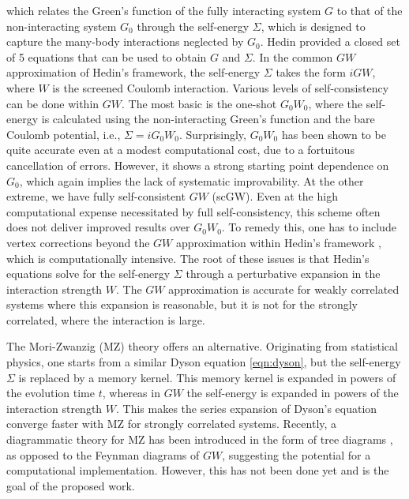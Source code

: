 which relates the Green's function of the fully interacting system \( G \) to that of the non-interacting system \( G_0 \) through the self-energy \( \Sigma \), which is designed to capture the many-body interactions neglected by \( G_0 \). Hedin provided a closed set of 5 equations that can be used to obtain \( G \) and \( \Sigma \). In the common \( GW \) approximation of Hedin's framework, the self-energy \( \Sigma \) takes the form \( iGW \), where \( W \) is the screened Coulomb interaction. Various levels of self-consistency can be done within \( GW \). The most basic is the one-shot \( G_0W_0 \), where the self-energy is calculated using the non-interacting Green's function and the bare Coulomb potential, i.e., \( \Sigma = iG_0W_0 \). Surprisingly, \( G_0W_0 \) has been shown to be quite accurate even at a modest computational cost, due to a fortuitous cancellation of errors. However, it shows a strong starting point dependence on \( G_0 \), which again implies the lack of systematic improvability. At the other extreme, we have fully self-consistent \( GW \) (scGW). Even at the high computational expense necessitated by full self-consistency, this scheme often does not deliver improved results over \( G_0W_0 \). To remedy this, one has to include vertex corrections beyond the \( GW \) approximation within Hedin's framework \cite{kutepov_one-electron_2017}, which is computationally intensive. The root of these issues is that Hedin's equations solve for the self-energy \( \Sigma \) through a perturbative expansion in the interaction strength \( W \). The \( GW \) approximation is accurate for weakly correlated systems where this expansion is reasonable, but it is not for the strongly correlated, where the interaction is large.

The Mori-Zwanzig (MZ) theory offers an alternative. Originating from statistical physics, one starts from a similar Dyson equation \ref{eqn:dyson}, but the self-energy \( \Sigma \) is replaced by a memory kernel. This memory kernel is expanded in powers of the evolution time \( t \), whereas in \( GW \) the self-energy is expanded in powers of the interaction strength \( W \). This makes the series expansion of Dyson's equation converge faster with MZ for strongly correlated systems. Recently, a diagrammatic theory for MZ has been introduced in the form of tree diagrams \cite{zhu_combinatorial_2022}, as opposed to the Feynman diagrams of \( GW \), suggesting the potential for a computational implementation. However, this has not been done yet and is the goal of the proposed work.